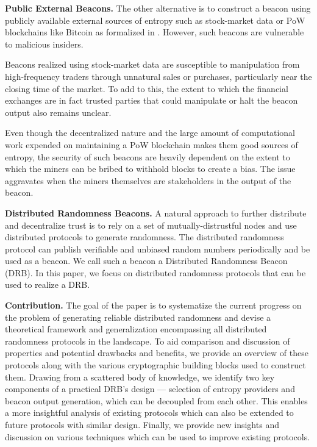 \documentclass[letterpaper,twocolumn,10pt]{article}
\theoremstyle{definition}
\theoremstyle{remark}
\begin{document}
\textbf{Public External Beacons.} The other alternative is to construct a beacon using publicly available external sources of entropy such as stock-market data \cite{clark2010use} or PoW blockchains like Bitcoin \cite{nakamoto2019bitcoin, han2020randchain} as formalized in \cite{bonneau2015bitcoin}. However, such beacons are vulnerable to malicious insiders.

Beacons realized using stock-market data are susceptible to manipulation from high-frequency traders through unnatural sales or purchases, particularly near the closing time of the market. To add to this, the extent to which the financial exchanges are in fact trusted parties that could manipulate or halt the beacon output also remains unclear.

Even though the decentralized nature and the large amount of computational work expended on maintaining a PoW blockchain makes them good sources of entropy, the security of such beacons are heavily dependent on the extent to which the miners can be bribed to withhold blocks to create a bias. The issue aggravates when the miners themselves are stakeholders in the output of the beacon.

\textbf{Distributed Randomness Beacons.}
A natural approach to further distribute and decentralize trust is to rely on a set of mutually-distrustful nodes and use distributed protocols to generate randomness. The distributed randomness protocol can publish verifiable and unbiased random numbers periodically and be used as a beacon. We call such a beacon a Distributed Randomness Beacon (DRB). In this paper, we focus on distributed randomness protocols that can be used to realize a DRB.

\textbf{Contribution.} The goal of the paper is to systematize the current progress on the problem of generating reliable distributed randomness and devise a theoretical framework and generalization encompassing all distributed randomness protocols in the landscape. To aid comparison and discussion of properties and potential drawbacks and benefits, we provide an overview of these protocols along with the various cryptographic building blocks used to construct them. Drawing from a scattered body of knowledge, we identify two key components of a practical DRB's design --- selection of entropy providers and beacon output generation, which can be decoupled from each other. This enables a more insightful analysis of existing protocols which can also be extended to future protocols with similar design. Finally, we provide new insights and discussion on various techniques which can be used to improve existing protocols.
\end{document}

